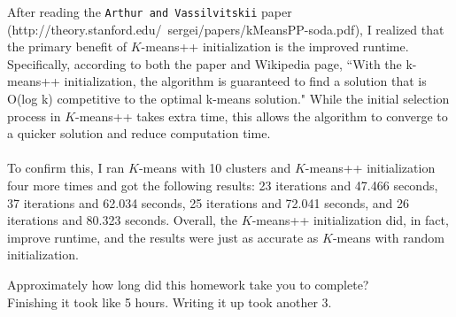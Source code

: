 \documentclass[submit]{harvardml}
\begin{document}

\noindent After reading the \texttt{Arthur and Vassilvitskii} paper (http://theory.stanford.edu/~sergei/papers/kMeansPP-soda.pdf), I realized that the primary benefit of $K$-means++ initialization is the improved runtime. Specifically, according to both the paper and Wikipedia page, ``With the k-means++ initialization, the algorithm is guaranteed to find a solution that is O(log k) competitive to the optimal k-means solution." While the initial selection process in $K$-means++ takes extra time, this allows the algorithm to converge to a quicker solution and reduce computation time. \\ \\
To confirm this, I ran $K$-means with 10 clusters and $K$-means++ initialization four more times and got the following results: 23 iterations and 47.466 seconds, 37 iterations and 62.034 seconds, 25 iterations and 72.041 seconds, and 26 iterations and 80.323 seconds. Overall, the $K$-means++ initialization did, in fact, improve runtime, and the results were just as accurate as $K$-means with random initialization. 
\newpage 

\begin{problem}[Calibration, 1pt]
Approximately how long did this homework take you to complete? \\ 
Finishing it took like 5 hours. Writing it up took another 3.
\end{problem}
\end{document}
